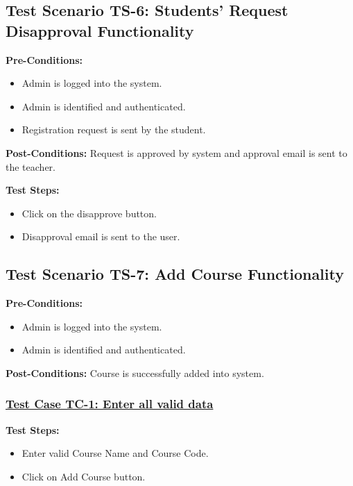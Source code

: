 \subsection{Test Scenario TS-6: Students' Request Disapproval Functionality}
\textbf{Pre-Conditions: }
\begin{itemize}

\item Admin is logged into the system.
\item Admin is identified and authenticated.
\item Registration request is sent by the student.

\end{itemize}
\textbf{Post-Conditions: } Request is approved by system and approval email is sent to the teacher. 

\textbf{Test Steps:}
\begin{itemize}

\item Click on the disapprove button.
\item Disapproval email is sent to the user.

\end{itemize}

\subsection{Test Scenario TS-7: Add Course Functionality}
\textbf{Pre-Conditions: } 
\begin{itemize}

\item Admin is logged into the system.
\item Admin is identified and authenticated.

\end{itemize}

\textbf{Post-Conditions: } Course is successfully added into system.
\subsubsection{\underline{Test Case TC-1: Enter all valid data}}
\textbf{Test Steps:}
\begin{itemize}

\item Enter valid Course Name and Course Code.
\item Click on Add Course button.

\end{itemize}

